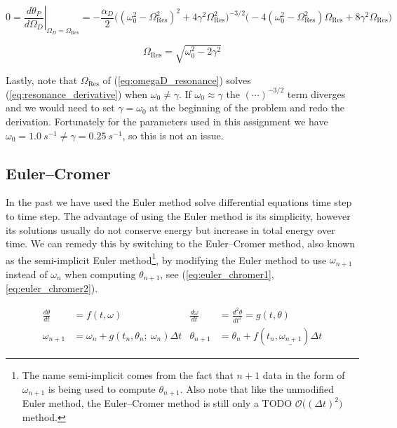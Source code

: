 \documentclass[notitlepage,aps,prd,nofootinbib]{revtex4-1}
\DeclareRobustCommand{\orderof}{\ensuremath{\mathcal{O}}}
\begin{document}
\begin{equation} \label{eq:resonance_derivative}
0 = \left.\frac{d \theta_{P}}{d \Omega_{D}}\right|_{\Omega_{D} = \Omega_{\text{Res}}}
= -\frac{\alpha_{D}}{2} \bigg( \left(\omega_{0}^2 - \Omega_{\text{Res}}^2\right)^2 + 4 \gamma^2 \Omega_{\text{Res}}^2 \bigg)^{-3/2}
\bigg(- 4 \left(\omega_{0}^2 - \Omega_{\text{Res}}^2\right) \Omega_{\text{Res}} + 8 \gamma^2 \Omega_{\text{Res}} \bigg)
\end{equation}

\begin{equation} \label{eq:omegaD_resonance}
\Omega_{\text{Res}} = \sqrt{ \omega_{0}^2 - 2 \gamma^2} 
\end{equation}

Lastly, note that $\Omega_{\text{Res}}$ of (\ref{eq:omegaD_resonance}) solves (\ref{eq:resonance_derivative}) when $\omega_{0} \neq \gamma$. If $\omega_{0} \approx \gamma$ the $(\cdots)^{-3/2}$ term diverges and we would need to set $\gamma = \omega_{0}$ at the beginning of the problem and redo the derivation. Fortunately for the parameters used in this assignment we have $\omega_{0} = 1.0~s^{-1} \neq \gamma = 0.25~s^{-1}$, so this is not an issue.

\subsection{Euler--Cromer}
\label{subsec:eulercromer}
In the past we have used the Euler method solve differential equations time step to time step. The advantage of using the Euler method is its simplicity, however its solutions usually do not conserve energy but increase in total energy over time. We can remedy this by switching to the Euler--Cromer method, also known as the semi-implicit Euler method\footnote{The name semi-implicit comes from the fact that $n+1$ data in the form of $\omega_{n+1}$ is being used to compute $\theta_{n+1}$. Also note that like the unmodified Euler method, the Euler--Cromer method is still only a TODO $\orderof\big(\left(\Delta t\right)^2\big)$ method.}, by modifying the Euler method to use $\omega_{n+1}$ instead of $\omega_{n}$ when computing $\theta_{n+1}$, see (\ref{eq:euler_chromer1}, \ref{eq:euler_chromer2}).

\begin{align}
\frac{d \theta}{d t} &= f\left(t, \omega\right) &
\frac{d \omega}{d t} &= \frac{d^2 \theta}{d t^2} = g\left(t, \theta\right) \label{eq:euler_chromer1} \\
\omega_{n+1} &= \omega_{n} + g\left(t_{n}, \theta_{n};~\omega_{n}\right) \Delta t & 
\theta_{n+1} &= \theta_{n} + f\left(t_{n}, \underline{\omega_{n+1}}\right) \Delta t \label{eq:euler_chromer2}
\end{align}
\end{document}
